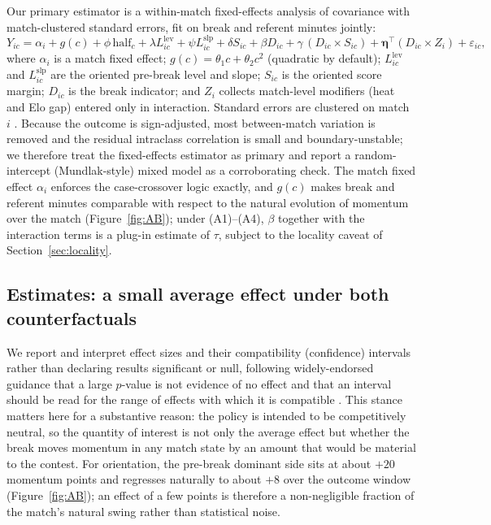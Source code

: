 \documentclass[11pt]{article}
\begin{document}
Our primary estimator is a within-match fixed-effects analysis of covariance with match-clustered standard
errors, fit on break and referent minutes jointly:
\begin{equation}
Y_{ic} = \alpha_i + g(c) + \phi\,\text{half}_{c} + \lambda L^{\text{lev}}_{ic} + \psi L^{\text{slp}}_{ic}
+ \delta S_{ic} + \beta D_{ic} + \gamma\,(D_{ic}\!\times\! S_{ic}) + \boldsymbol{\eta}^\top(D_{ic}\!\times\! Z_i)
+ \varepsilon_{ic},
\label{eq:model}
\end{equation}
where $\alpha_i$ is a match fixed effect; $g(c)=\theta_1 c+\theta_2 c^2$ (quadratic by default);
$L^{\text{lev}}_{ic}$ and $L^{\text{slp}}_{ic}$ are the oriented pre-break level and slope; $S_{ic}$ is the
oriented score margin; $D_{ic}$ is the break indicator; and $Z_i$ collects match-level modifiers (heat and Elo
gap) entered only in interaction. Standard errors are clustered on match $i$ \citep{liang1986gee,cameron2015cluster}.
Because the outcome is sign-adjusted, most between-match variation is removed and the residual intraclass
correlation is small and boundary-unstable; we therefore treat the fixed-effects estimator as primary and
report a random-intercept (Mundlak-style) mixed model \citep{mundlak1978pooling} as a corroborating check. The
match fixed effect $\alpha_i$ enforces the case-crossover logic exactly, and $g(c)$ makes break and referent
minutes comparable with respect to the natural evolution of momentum over the match (Figure~\ref{fig:AB});
under (A1)--(A4), $\beta$ together with the interaction terms is a plug-in estimate of $\tau$, subject to the
locality caveat of Section~\ref{sec:locality}.

\subsection{Estimates: a small average effect under both counterfactuals}
\label{sec:results}

We report and interpret effect sizes and their compatibility (confidence) intervals rather than declaring
results significant or null, following widely-endorsed guidance that a large $p$-value is not evidence of no
effect and that an interval should be read for the range of effects with which it is compatible
\citep{wasserstein2016asa,greenland2016misinterpret,amrhein2019retire}. This stance matters here for a
substantive reason: the policy is intended to be competitively neutral, so the quantity of interest is not
only the average effect but whether the break moves momentum in any match state by an amount that would be
material to the contest. For orientation, the pre-break dominant side sits at about $+20$ momentum points and
regresses naturally to about $+8$ over the outcome window (Figure~\ref{fig:AB}); an effect of a few points is
therefore a non-negligible fraction of the match's natural swing rather than statistical noise.
\end{document}
